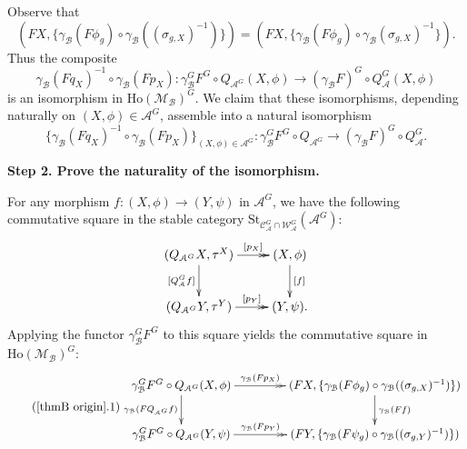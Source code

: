 \documentclass[12pt,twoside]{amsart}
\theoremstyle{bfupright head,slanted body}
\theoremstyle{bfupright head,upright body}
\theoremstyle{fixed bf head,slanted body}
\theoremstyle{fixed bf head,upright body}
\theoremstyle{numbered paragraph}
\newenvironment{prf*}[1][Proof]{%
  \begin{proof}[\bf #1]
    \setcounter{equation}{0}
    \renewcommand{\theequation}{\arabic{equation}}}
  {\end{proof}
}
\numberwithin{equation}{res}
\newcommand{\calC}{\mathcal{C}}
\newcommand{\calW}{\mathcal{W}}
\newcommand{\calA}{\mathcal{A}}
\newcommand{\calB}{\mathcal{B}}
\newcommand{\calM}{\mathcal{M}}
\newcommand{\Ho}{\mathrm{Ho}}
\newcommand{\St}{\mathrm{St}}
\begin{document}
\begin{prf*}
Observe that
\[
(FX, \{\gamma_\calB(F \phi_g) \circ \gamma_\calB((\sigma_{g, X})^{-1})\})
=
(FX, \{\gamma_\calB(F \phi_g) \circ \gamma_\calB(\sigma_{g, X})^{-1}\}).
\]
Thus the composite
\[
\gamma_\calB(F q_X)^{-1} \circ \gamma_\calB(F p_X) :
\gamma_\calB^G F^G \circ Q_{\calA^G}(X, \phi) \to (\gamma_\calB F)^G \circ Q_\calA^G(X, \phi)
\]
is an isomorphism in $\Ho(\calM_\calB)^G$.
We claim that these isomorphisms, depending naturally on $(X,\phi)\in\calA^G$, assemble into a natural isomorphism
\[
\{\gamma_\calB(F q_X)^{-1} \circ \gamma_\calB(F p_X)\}_{(X, \phi) \in \calA^G} :
\gamma_\calB^G F^G \circ Q_{\calA^G} \to (\gamma_\calB F)^G \circ Q_\calA^G.
\]

\vspace{1ex}\textbf{Step 2. Prove the naturality of the isomorphism.}

For any morphism $f : (X, \phi) \to (Y, \psi)$ in $\calA^G$, we have the following commutative square in the stable category $\St_{\calC_\calA^G \cap \calW_\calA^G}(\calA^G)$:
\[
\xymatrix{
   (Q_{\calA^G} X, \tau^X)
\ar[d]_-{[Q_\calA^G f]}
\ar@{->>}[r]^-{[p_X]}
&  (X, \phi)
\ar[d]^{[f]}               \\
   (Q_{\calA^G} Y, \tau^Y)
\ar@{->>}[r]^-{[p_Y]}
&  (Y, \psi).                                            }
\]
Applying the functor $\gamma_\calB^G F^G$ to this square yields the commutative square in $\Ho(\calM_\calB)^G$:
\begin{equation*} \label{key square 1} \tag{\ref{thmB origin}.1}
\begin{gathered}
\xymatrix@C=1.5CM{
   \gamma_\calB^G F^G \circ Q_{\calA^G}(X, \phi)
\ar@{->>}[r]^-{\gamma_\calB(F p_X)}
\ar[d]_-{\gamma_\calB(F Q_{\calA^G} f)}
&  (FX, \{\gamma_\calB(F \phi_g) \circ \gamma_\calB((\sigma_{g, X})^{-1})\})
\ar[d]^-{\gamma_\calB(F f)}                   \\
   \gamma_\calB^G F^G \circ Q_{\calA^G}(Y, \psi)
\ar@{->>}[r]^-{\gamma_\calB(F p_Y)}
&  (FY, \{\gamma_\calB(F \psi_g) \circ \gamma_\calB((\sigma_{g, Y})^{-1})\})
}
\end{gathered}
\end{equation*}


\end{prf*}
\end{document}
